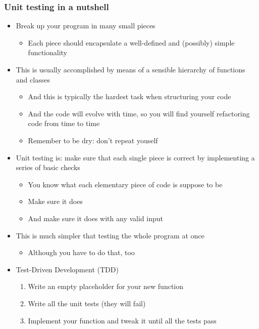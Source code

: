 \documentclass[9pt]{beamer}
\begin{document}
\begin{frame}
  \frametitle{Unit testing in a nutshell}
  \begin{itemize}
  \item Break up your program in many small pieces
    \begin{itemize}
    \item Each piece should encapsulate a well-defined and (possibly) simple
      functionality
    \end{itemize}
  \item This is usually accomplished by means of a sensible hierarchy of
    functions and classes
    \begin{itemize}
    \item And this is typically the hardest task when structuring your code
    \item And the code will evolve with time, so you will find yourself
      \alert{refactoring code} from time to time
    \item Remember to be dry: don't repeat youself
    \end{itemize}
  \item \alert{Unit testing is: make sure that each single piece is
    correct by implementing a series of basic checks}
    \begin{itemize}
    \item You know what each elementary piece of code is suppose to be
    \item Make sure it does
    \item And make sure it does with any valid input
    \end{itemize}
  \item This is much simpler that testing the whole program at once
    \begin{itemize}
    \item Although you have to do that, too
    \end{itemize}
  \item \alert{Test-Driven Development (TDD)}
    \begin{enumerate}
    \item Write an empty placeholder for your new function
    \item Write all the unit tests (they will fail)
    \item Implement your function and tweak it until all the tests pass
    \end{enumerate}
  \end{itemize}
\end{frame}
\end{document}
